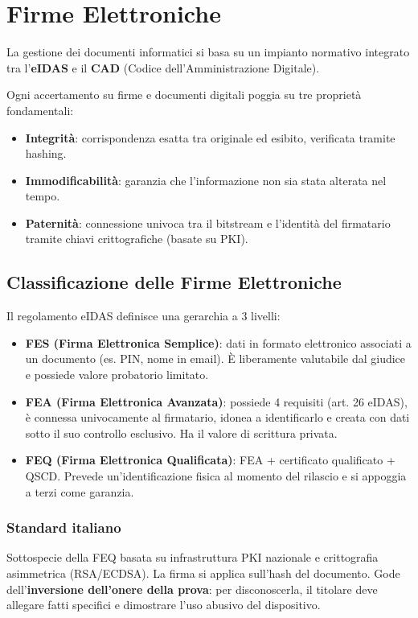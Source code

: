 \documentclass[11pt,a4paper]{article}
\begin{document}

\section{Firme Elettroniche}
La gestione dei documenti informatici si basa su un impianto normativo integrato tra l'\textbf{eIDAS} e il \textbf{CAD} (Codice dell'Amministrazione Digitale).

Ogni accertamento su firme e documenti digitali poggia su tre proprietà fondamentali:
\begin{itemize}
    \item \textbf{Integrità}: corrispondenza esatta tra originale ed esibito, verificata tramite hashing.
    \item \textbf{Immodificabilità}: garanzia che l'informazione non sia stata alterata nel tempo.
    \item \textbf{Paternità}: connessione univoca tra il bitstream e l'identità del firmatario tramite chiavi crittografiche (basate su PKI).
\end{itemize}

\subsection{Classificazione delle Firme Elettroniche}
Il regolamento eIDAS definisce una gerarchia a 3 livelli:
\begin{itemize}
    \item \textbf{FES (Firma Elettronica Semplice)}: dati in formato elettronico associati a un documento (es. PIN, nome in email). È liberamente valutabile dal giudice e possiede valore probatorio limitato.
    \item \textbf{FEA (Firma Elettronica Avanzata)}: possiede 4 requisiti (art. 26 eIDAS), è connessa univocamente al firmatario, idonea a identificarlo e creata con dati sotto il suo controllo esclusivo. Ha il valore di scrittura privata.
    \item \textbf{FEQ (Firma Elettronica Qualificata)}: FEA + certificato qualificato + QSCD. Prevede un'identificazione fisica al momento del rilascio e si appoggia a terzi come garanzia.
\end{itemize}

\subsubsection{Standard italiano} 
Sottospecie della FEQ basata su infrastruttura PKI nazionale e crittografia asimmetrica (RSA/ECDSA). La firma si applica sull'hash del documento. 
Gode dell'\textbf{inversione dell'onere della prova}: per disconoscerla, il titolare deve allegare fatti specifici e dimostrare l'uso abusivo del dispositivo.
\end{document}
